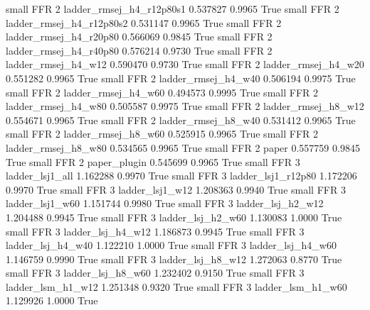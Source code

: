      small      FFR                 2 ladder_rmsej_h4_r12p80s1   0.537827      0.9965    True
     small      FFR                 2 ladder_rmsej_h4_r12p80s2   0.531147      0.9965    True
     small      FFR                 2   ladder_rmsej_h4_r20p80   0.566069      0.9845    True
     small      FFR                 2   ladder_rmsej_h4_r40p80   0.576214      0.9730    True
     small      FFR                 2      ladder_rmsej_h4_w12   0.590470      0.9730    True
     small      FFR                 2      ladder_rmsej_h4_w20   0.551282      0.9965    True
     small      FFR                 2      ladder_rmsej_h4_w40   0.506194      0.9975    True
     small      FFR                 2      ladder_rmsej_h4_w60   0.494573      0.9995    True
     small      FFR                 2      ladder_rmsej_h4_w80   0.505587      0.9975    True
     small      FFR                 2      ladder_rmsej_h8_w12   0.554671      0.9965    True
     small      FFR                 2      ladder_rmsej_h8_w40   0.531412      0.9965    True
     small      FFR                 2      ladder_rmsej_h8_w60   0.525915      0.9965    True
     small      FFR                 2      ladder_rmsej_h8_w80   0.534565      0.9965    True
     small      FFR                 2                    paper   0.557759      0.9845    True
     small      FFR                 2             paper_plugin   0.545699      0.9965    True
     small      FFR                 3          ladder_lsj1_all   1.162288      0.9970    True
     small      FFR                 3       ladder_lsj1_r12p80   1.172206      0.9970    True
     small      FFR                 3          ladder_lsj1_w12   1.208363      0.9940    True
     small      FFR                 3          ladder_lsj1_w60   1.151744      0.9980    True
     small      FFR                 3        ladder_lsj_h2_w12   1.204488      0.9945    True
     small      FFR                 3        ladder_lsj_h2_w60   1.130083      1.0000    True
     small      FFR                 3        ladder_lsj_h4_w12   1.186873      0.9945    True
     small      FFR                 3        ladder_lsj_h4_w40   1.122210      1.0000    True
     small      FFR                 3        ladder_lsj_h4_w60   1.146759      0.9990    True
     small      FFR                 3        ladder_lsj_h8_w12   1.272063      0.8770    True
     small      FFR                 3        ladder_lsj_h8_w60   1.232402      0.9150    True
     small      FFR                 3        ladder_lsm_h1_w12   1.251348      0.9320    True
     small      FFR                 3        ladder_lsm_h1_w60   1.129926      1.0000    True
